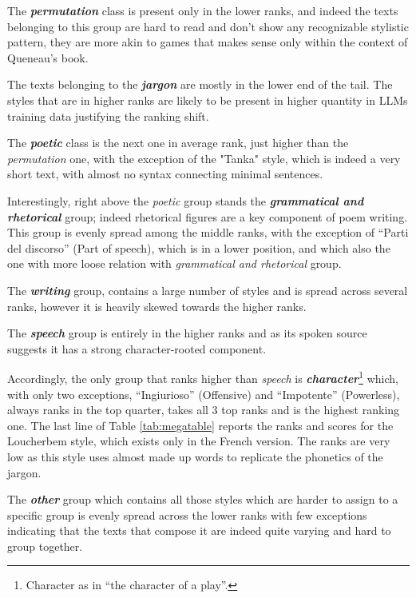 \documentclass[
twocolumn,
]{ceurart}
\begin{document}
The \textbf{\emph{permutation}} class is present only in the lower ranks, and indeed the texts belonging to this group are hard to read and don't show any recognizable stylistic pattern, they are more akin to games that makes sense only within the context of Queneau's book.

The texts belonging to the \textbf{\emph{jargon}} are mostly in the lower end of the tail. 
The styles that are in higher ranks are likely to be present in higher quantity in LLMs training data justifying the ranking shift.

The \textbf{\emph{poetic}} class is the next one in average rank, just higher than the \emph{permutation} one, with the exception of the "Tanka" style, which is indeed a very short text, with almost no syntax connecting minimal sentences.

Interestingly, right above the \emph{poetic} group stands the \textbf{\emph{grammatical and rhetorical}} group; indeed rhetorical figures are a key component of poem writing. This group is evenly spread among the middle ranks, with the exception of ``Parti del discorso'' (Part of speech), which is in a lower position, and which also the one with more loose relation with \emph{grammatical and rhetorical} group.

The \textbf{\emph{writing}} group, contains a large number of styles and is spread across several ranks, however it is heavily skewed towards the higher ranks.

The \textbf{\emph{speech}} group is entirely in the higher ranks and as its spoken source suggests it has a strong character-rooted component.

Accordingly, the only group that ranks higher than \emph{speech} is \textbf{\emph{character}}\footnote{Character as in ``the character of a play''.} which, with only two exceptions, ``Ingiurioso'' (Offensive) and ``Impotente'' (Powerless), always ranks in the top quarter, takes all 3 top ranks and is the highest ranking one.
The last line of Table \ref{tab:megatable} reports the ranks and scores for the Loucherbem style, which exists only in the French version. The ranks are very low as this style uses almost made up words to replicate the phonetics of the jargon.

The \textbf{\emph{other}} group which contains all those styles which are harder to assign to a specific group is evenly spread across the lower ranks with few exceptions indicating that the texts that compose it are indeed quite varying and hard to group together.
\end{document}
